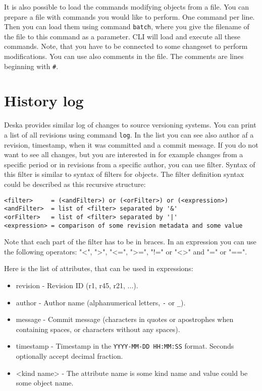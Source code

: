 \documentclass[deska]{subfiles}
\begin{document}
It is also possible to load the commands modifying objects from a file. You can prepare a file with commands you would
like to perform. One command per line. Then you can load them using command {\tt batch}, where you give the filename
of the file to this command as a parameter. CLI will load and execute all these commands. Note, that you have to be
connected to some changeset to perform modifications. You can use also comments in the file. The comments are lines
beginning with {\tt \#}.

\section{History log}

Deska provides similar log of changes to source versioning systems. You can print a list of all revisions using
command {\tt log}. In the list you can see also author af a revision, timestamp, when it was committed and a commit
message. If you do not want to see all changes, but you are interested in for example changes from a specific period
or in revisions from a specific author, you can use filter. Syntax of this filter is similar to syntax of filters for
objects. The filter definition syntax could be described as this recursive structure:

\begin{verbatim}
<filter>     = (<andFilter>) or (<orFilter>) or (<expression>)
<andFilter>  = list of <filter> separated by '&'
<orFilter>   = list of <filter> separated by '|'
<expression> = comparison of some revision metadata and some value
\end{verbatim}

Note that each part of the filter has to be in braces. In an expression you can use the following operators: "<", ">",
"<=", ">=", "!=" or "<>" and "=" or "==".

Here is the list of attributes, that can be used in expressions:

\begin{itemize}
    \item{revision} - Revision ID (r1, r45, r21, ...).
    \item{author} - Author name (alphanumerical letters, {\tt -} or {\tt \_}).
    \item{message} - Commit message (characters in quotes or apostrophes when containing spaces, or characters without any spaces).
    \item{timestamp} - Timestamp in the {\tt YYYY-MM-DD HH:MM:SS} format.  Seconds optionally accept decimal fraction.
    \item{<kind name>} - The attribute name is some kind name and value could be some object name.
\end{itemize}
\end{document}
